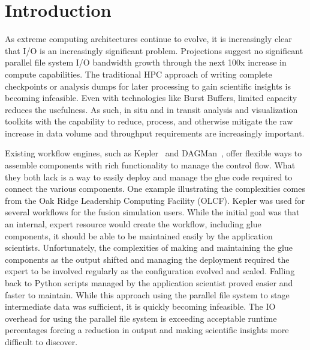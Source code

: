 \documentclass[conference]{IEEEtran}
\begin{document}

\section{Introduction}
\label{s:intro}

As extreme computing architectures continue to evolve, it is increasingly
clear that I/O is an increasingly significant problem.  Projections suggest no
significant parallel file system I/O bandwidth growth through the next 100x
increase in compute capabilities.  The traditional HPC approach of writing
complete checkpoints or analysis dumps for later processing to gain scientific
insights is becoming infeasible.  Even with technologies like Burst Buffers,
limited capacity reduces the usefulness. As such, in situ and in transit
analysis and visualization toolkits with the capability to reduce, process, and
otherwise mitigate the raw increase in data volume and throughput requirements
are increasingly important.

Existing workflow engines, such as Kepler~\cite{bertram:2006:kepler} and
DAGMan~\cite{Malewicz:2006:dagman}, offer flexible ways to assemble components
with rich functionality to manage the control flow. What they both lack is a
way to easily deploy and manage the glue code required to connect the various
components. One example illustrating the complexities comes from the Oak Ridge
Leadership Computing Facility (OLCF).  Kepler was used for several workflows
for the fusion simulation users.  While the initial goal was that an internal,
expert resource would create the workflow, including glue components, it should
be able to be maintained easily by the application scientists. Unfortunately,
the complexities of making and maintaining the glue components as the output
shifted and managing the deployment required the expert to be involved
regularly as the configuration evolved and scaled.  Falling back to Python
scripts managed by the application scientist proved easier and faster to
maintain. While this approach using the parallel file system to stage
intermediate data was sufficient, it is quickly becoming infeasible. The IO
overhead for using the parallel file system is exceeding acceptable runtime
percentages forcing a reduction in output and making scientific insights more
difficult to discover.
\end{document}
